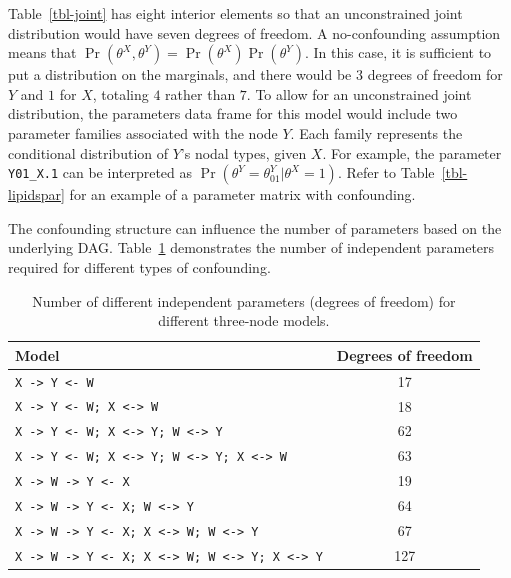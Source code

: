 \documentclass[
  11pt,
  article]{jss}
\begin{document}
Table~\ref{tbl-joint} has eight interior elements so that an
unconstrained joint distribution would have seven degrees of freedom. A
no-confounding assumption means that
\(\Pr(\theta^X, \theta^Y) = \Pr(\theta^X)\Pr(\theta^Y)\). In this case,
it is sufficient to put a distribution on the marginals, and there would
be \(3\) degrees of freedom for \(Y\) and \(1\) for \(X\), totaling
\(4\) rather than \(7\). To allow for an unconstrained joint
distribution, the parameters data frame for this model would include two
parameter families associated with the node \(Y\). Each family
represents the conditional distribution of \(Y\)'s nodal types, given
\(X\). For example, the parameter \texttt{Y01\_X.1} can be interpreted
as \(\Pr(\theta^Y = \theta^Y_{01} | \theta^X=1)\). Refer to
Table~\ref{tbl-lipidspar} for an example of a parameter matrix with
confounding.

The confounding structure can influence the number of parameters based
on the underlying DAG. Table~\ref{tbl-dof} demonstrates the number of
independent parameters required for different types of confounding.

\begin{longtable}[]{@{}lc@{}}

\caption{\label{tbl-dof}Number of different independent parameters
(degrees of freedom) for different three-node models.}

\tabularnewline

\toprule\noalign{}
Model & Degrees of freedom \\
\midrule\noalign{}
\endhead
\bottomrule\noalign{}
\endlastfoot
\texttt{X\ -\textgreater{}\ Y\ \textless{}-\ W} & 17 \\
\texttt{X\ -\textgreater{}\ Y\ \textless{}-\ W;\ X\ \textless{}-\textgreater{}\ W}
& 18 \\
\texttt{X\ -\textgreater{}\ Y\ \textless{}-\ W;\ X\ \textless{}-\textgreater{}\ Y;\ W\ \textless{}-\textgreater{}\ Y}
& 62 \\
\texttt{X\ -\textgreater{}\ Y\ \textless{}-\ W;\ X\ \textless{}-\textgreater{}\ Y;\ W\ \textless{}-\textgreater{}\ Y;\ X\ \textless{}-\textgreater{}\ W}
& 63 \\
\texttt{X\ -\textgreater{}\ W\ -\textgreater{}\ Y\ \textless{}-\ X} &
19 \\
\texttt{X\ -\textgreater{}\ W\ -\textgreater{}\ Y\ \textless{}-\ X;\ W\ \textless{}-\textgreater{}\ Y}
& 64 \\
\texttt{X\ -\textgreater{}\ W\ -\textgreater{}\ Y\ \textless{}-\ X;\ X\ \textless{}-\textgreater{}\ W;\ W\ \textless{}-\textgreater{}\ Y}
& 67 \\
\texttt{X\ -\textgreater{}\ W\ -\textgreater{}\ Y\ \textless{}-\ X;\ X\ \textless{}-\textgreater{}\ W;\ W\ \textless{}-\textgreater{}\ Y;\ X\ \textless{}-\textgreater{}\ Y}
& 127 \\

\end{longtable}
\end{document}
